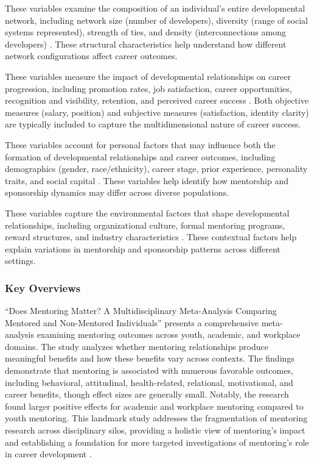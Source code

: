 \documentclass[main.tex]{subfiles}
\begin{document}
These variables examine the composition of an individual's entire developmental network, including network size (number of developers), diversity (range of social systems represented), strength of ties, and density (interconnections among developers) \cite{higgins2023celebrating, cdc2015network}. These structural characteristics help understand how different network configurations affect career outcomes.

These variables measure the impact of developmental relationships on career progression, including promotion rates, job satisfaction, career opportunities, recognition and visibility, retention, and perceived career success \cite{dubois2011does, togetherplatform2023mentoring}. Both objective measures (salary, position) and subjective measures (satisfaction, identity clarity) are typically included to capture the multidimensional nature of career success.

These variables account for personal factors that may influence both the formation of developmental relationships and career outcomes, including demographics (gender, race/ethnicity), career stage, prior experience, personality traits, and social capital \cite{pmc2015mapping, alachkar2023sponsor}. These variables help identify how mentorship and sponsorship dynamics may differ across diverse populations.

These variables capture the environmental factors that shape developmental relationships, including organizational culture, formal mentoring programs, reward structures, and industry characteristics \cite{alachkar2023sponsor, rsna2021mentorship}. These contextual factors help explain variations in mentorship and sponsorship patterns across different settings.

\subsubsection{Key Overviews}

``Does Mentoring Matter? A Multidisciplinary Meta-Analysis Comparing Mentored and Non-Mentored Individuals'' presents a comprehensive meta-analysis examining mentoring outcomes across youth, academic, and workplace domains. The study analyzes whether mentoring relationships produce meaningful benefits and how these benefits vary across contexts. The findings demonstrate that mentoring is associated with numerous favorable outcomes, including behavioral, attitudinal, health-related, relational, motivational, and career benefits, though effect sizes are generally small. Notably, the research found larger positive effects for academic and workplace mentoring compared to youth mentoring. This landmark study addresses the fragmentation of mentoring research across disciplinary silos, providing a holistic view of mentoring's impact and establishing a foundation for more targeted investigations of mentoring's role in career development \cite{dubois2011does}.
\end{document}
